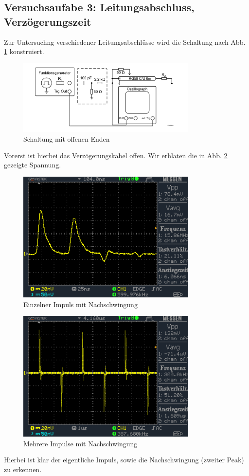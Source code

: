 \documentclass[a4paper,12pt,twocoloumn]{article}
\numberwithin{equation}{section}
\begin{document}
\subsection{Versuchsaufabe 3: Leitungsabschluss, Verzögerungszeit}
Zur Untersuchng verschiedener Leitungsabschlüsse wird die Schaltung nach Abb. \ref{fig:3.1} konstruiert. 
\begin{figure}[h]
        \centering
        \includegraphics[width=0.8\textwidth]{Schaltung_Abschluss.png}
        \caption{Schaltung mit offenen Enden}
		\label{fig:3.1}
\end{figure}

Vorerst ist hierbei das Verzögerungskabel offen. Wir erhlaten die in Abb. \ref{fig:3.2} gezeigte Spannung.
\begin{figure}[h]
        \centering
        \includegraphics[width=0.8\textwidth]{data/DS0018.BMP.png}
        \caption{Einzelner Impuls mit Nachschwingung}
		\label{fig:3.2}
\end{figure}
\begin{figure}[h]
        \centering
        \includegraphics[width=0.8\textwidth]{data/DS0021.BMP.png}
        \caption{Mehrere Impulse mit Nachschwingung}
		\label{fig:3.3}
\end{figure}
Hierbei ist klar der eigentliche Impuls, sowie die Nachschwingung (zweiter Peak) zu erkennen.
\end{document}
